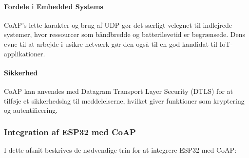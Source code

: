 \paragraph{Fordele i Embedded Systems}
CoAP's lette karakter og brug af UDP gør det særligt velegnet til indlejrede systemer, hvor ressourcer som båndbredde og batterilevetid er begrænsede. Dens evne til at arbejde i usikre netværk gør den også til en god kandidat til IoT-applikationer.

\paragraph{Sikkerhed}
CoAP kan anvendes med Datagram Transport Layer Security (DTLS) for at tilføje et sikkerhedslag til meddelelserne, hvilket giver funktioner som kryptering og autentificering.

\subsubsection{Integration af ESP32 med CoAP}
I dette afsnit beskrives de nødvendige trin for at integrere ESP32 med CoAP:


